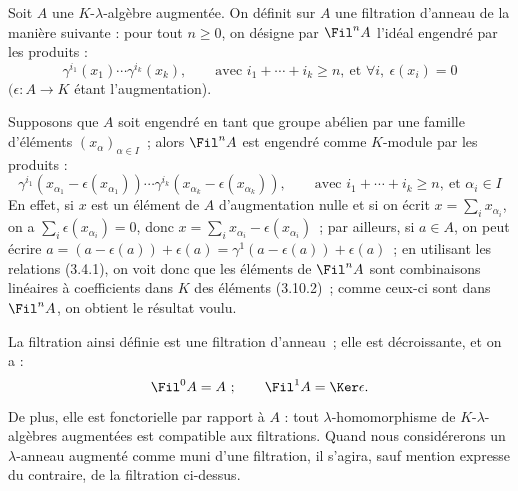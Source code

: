 Soit \(A\) une \(K\)-\(\lambda\)-algèbre augmentée. On définit sur \(A\) une filtration d'anneau de la manière suivante : pour tout \(n\ge0\), on désigne par \(\Fil^n A\) l'idéal engendré par les produits :
\begin{equation}\tag{3.10.1}
  \gamma^{i_1}(x_1)\cdots\gamma^{i_k}(x_k),
  \qquad \text{avec } i_1+\cdots+i_k\ge n,\ \text{et } \forall i,\ \epsilon(x_i)=0
\end{equation}
\((\epsilon:A\to K\) étant l'augmentation).

Supposons que \(A\) soit engendré en tant que groupe abélien par une famille d'éléments \((x_\alpha)_{\alpha\in I}\)~; alors \(\Fil^n A\) est engendré comme \(K\)-module par les produits :
\begin{equation}\tag{3.10.2}
  \gamma^{i_1}(x_{\alpha_1}-\epsilon(x_{\alpha_1}))\cdots
  \gamma^{i_k}(x_{\alpha_k}-\epsilon(x_{\alpha_k})),
  \qquad \text{avec } i_1+\cdots+i_k\ge n,\ \text{et } \alpha_i\in I
\end{equation}
En effet, si \(x\) est un élément de \(A\) d'augmentation nulle et si on écrit \(x=\sum_i x_{\alpha_i}\), on a \(\sum_i \epsilon(x_{\alpha_i})=0\), donc \(x=\sum_i x_{\alpha_i}-\epsilon(x_{\alpha_i})\)~; par ailleurs, si \(a\in A\), on peut écrire \(a=(a-\epsilon(a))+\epsilon(a)=\gamma^1(a-\epsilon(a))+\epsilon(a)\)~; en utilisant les relations (3.4.1), on voit donc que les éléments de \(\Fil^n A\) sont combinaisons linéaires à coefficients dans \(K\) des éléments (3.10.2)~; comme ceux-ci sont dans \(\Fil^n A\), on obtient le résultat voulu.

La filtration ainsi définie est une filtration d'anneau~; elle est décroissante, et on a :
\[
  \Fil^0A=A~;
  \qquad \Fil^1A=\Ker\epsilon.
\]
De plus, elle est fonctorielle par rapport à \(A\) : tout \(\lambda\)-homomorphisme de \(K\)-\(\lambda\)-algèbres augmentées est compatible aux filtrations. Quand nous considérerons un \(\lambda\)-anneau augmenté comme muni d'une filtration, il s'agira, sauf mention expresse du contraire, de la filtration ci-dessus.

